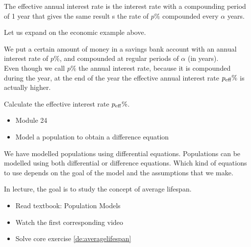 \begin{annotation}
\begin{goals}
	The effective annual interest rate is the interest rate with a compounding period of 1 year that gives the same result s the rate of $p\%$ compounded every $\alpha$ years.
\end{goals}
\end{annotation}
\question \label{de:economic}
	Let us expand on the economic example above.
	
	We put a certain amount of money in a savings bank account with an annual interest rate of $p\%$, and compounded at regular periods of $\alpha$ (in years). \\
	
	Even though we call $p\%$ the annual interest rate, because it is compounded during the year, at the end of the year the effective annual interest rate $p_{\rm eff}\%$ is actually higher.
	
	Calculate the effective interest rate $p_{\rm eff}\%$.


	

\bookonlynewpage



\begin{lesson}

	\begin{itemize}
		\item Module 24
	\end{itemize}

	\begin{itemize}
		\item Model a population to obtain a difference equation
	\end{itemize}
	

We have modelled populations using differential equations. Populations can be modelled using both differential or difference equations. Which kind of equations to use depends on the goal of the model and the assumptions that we make.

In lecture, the goal is to study the concept of average lifespan.


\begin{itemize}
	\item Read textbook: Population Models
	\item Watch the first corresponding video
	\item Solve core exercise \ref{de:averagelifespan}
\end{itemize}

\end{lesson}




